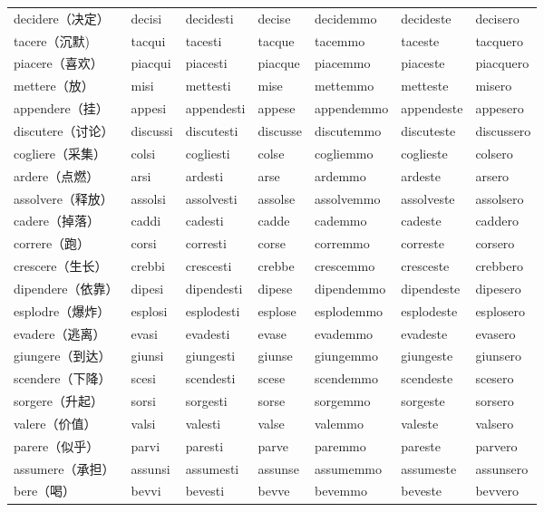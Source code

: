 \documentclass[UTF8,a4paper,titlepage,10pt]{report}
\begin{document}
\begin{enumerate}
\begin{itemize}
\begin{center}
\begin{tabular}{lllllll}
decidere（决定） & decisi & decidesti & decise & decidemmo & decideste & decisero\\
tacere（沉默) & tacqui & tacesti & tacque & tacemmo & taceste & tacquero\\
piacere（喜欢） & piacqui & piacesti & piacque & piacemmo & piaceste & piacquero\\
mettere（放） & misi & mettesti & mise & mettemmo & metteste & misero\\
appendere（挂） & appesi & appendesti & appese & appendemmo & appendeste & appesero\\
discutere（讨论） & discussi & discutesti & discusse & discutemmo & discuteste & discussero\\
cogliere（采集） & colsi & cogliesti & colse & cogliemmo & coglieste & colsero\\
ardere（点燃） & arsi & ardesti & arse & ardemmo & ardeste & arsero\\
assolvere（释放） & assolsi & assolvesti & assolse & assolvemmo & assolveste & assolsero\\
cadere（掉落） & caddi & cadesti & cadde & cademmo & cadeste & caddero\\
correre（跑） & corsi & corresti & corse & corremmo & correste & corsero\\
crescere（生长） & crebbi & crescesti & crebbe & crescemmo & cresceste & crebbero\\
dipendere（依靠） & dipesi & dipendesti & dipese & dipendemmo & dipendeste & dipesero\\
esplodre（爆炸） & esplosi & esplodesti & esplose & esplodemmo & esplodeste & esplosero\\
evadere（逃离） & evasi & evadesti & evase & evademmo & evadeste & evasero\\
giungere（到达） & giunsi & giungesti & giunse & giungemmo & giungeste & giunsero\\
scendere（下降） & scesi & scendesti & scese & scendemmo & scendeste & scesero\\
sorgere（升起） & sorsi & sorgesti & sorse & sorgemmo & sorgeste & sorsero\\
valere（价值） & valsi & valesti & valse & valemmo & valeste & valsero\\
parere（似乎） & parvi & paresti & parve & paremmo & pareste & parvero\\
assumere（承担） & assunsi & assumesti & assunse & assumemmo & assumeste & assunsero\\
bere（喝） & bevvi & bevesti & bevve & bevemmo & beveste & bevvero\\

\end{tabular}
\end{center}
\end{itemize}
\end{enumerate}
\end{document}
